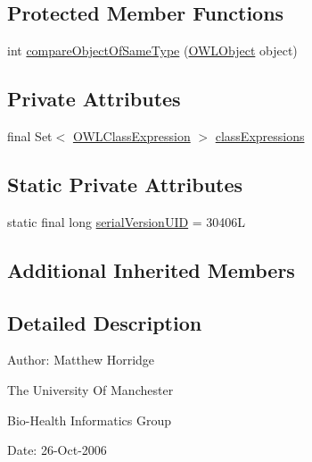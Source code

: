 \subsection*{Protected Member Functions}
\begin{DoxyCompactItemize}
\item 
int \hyperlink{classuk_1_1ac_1_1manchester_1_1cs_1_1owl_1_1owlapi_1_1_o_w_l_nary_class_axiom_impl_a06c633f79d0dbfc855353a3ad61bf082}{compare\-Object\-Of\-Same\-Type} (\hyperlink{interfaceorg_1_1semanticweb_1_1owlapi_1_1model_1_1_o_w_l_object}{O\-W\-L\-Object} object)
\end{DoxyCompactItemize}
\subsection*{Private Attributes}
\begin{DoxyCompactItemize}
\item 
final Set$<$ \hyperlink{interfaceorg_1_1semanticweb_1_1owlapi_1_1model_1_1_o_w_l_class_expression}{O\-W\-L\-Class\-Expression} $>$ \hyperlink{classuk_1_1ac_1_1manchester_1_1cs_1_1owl_1_1owlapi_1_1_o_w_l_nary_class_axiom_impl_a1f49ad91a00e2548f99a93ca8de82f7c}{class\-Expressions}
\end{DoxyCompactItemize}
\subsection*{Static Private Attributes}
\begin{DoxyCompactItemize}
\item 
static final long \hyperlink{classuk_1_1ac_1_1manchester_1_1cs_1_1owl_1_1owlapi_1_1_o_w_l_nary_class_axiom_impl_a7b3ccb84867078585bcdde918db3d55b}{serial\-Version\-U\-I\-D} = 30406\-L
\end{DoxyCompactItemize}
\subsection*{Additional Inherited Members}


\subsection{Detailed Description}
Author\-: Matthew Horridge\par
 The University Of Manchester\par
 Bio-\/\-Health Informatics Group\par
 Date\-: 26-\/\-Oct-\/2006\par
\par
 

